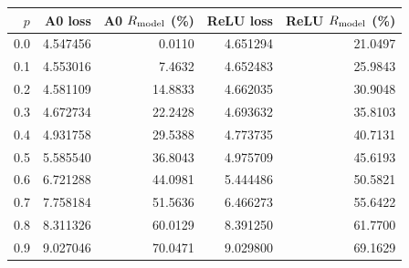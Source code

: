\begin{tabular}{rrrrr}
\toprule
$p$ & A0 loss & A0 $R_{\mathrm{model}}$ (\%) & ReLU loss & ReLU $R_{\mathrm{model}}$ (\%) \\
\midrule
0.0 & 4.547456 & 0.0110 & 4.651294 & 21.0497 \\
0.1 & 4.553016 & 7.4632 & 4.652483 & 25.9843 \\
0.2 & 4.581109 & 14.8833 & 4.662035 & 30.9048 \\
0.3 & 4.672734 & 22.2428 & 4.693632 & 35.8103 \\
0.4 & 4.931758 & 29.5388 & 4.773735 & 40.7131 \\
0.5 & 5.585540 & 36.8043 & 4.975709 & 45.6193 \\
0.6 & 6.721288 & 44.0981 & 5.444486 & 50.5821 \\
0.7 & 7.758184 & 51.5636 & 6.466273 & 55.6422 \\
0.8 & 8.311326 & 60.0129 & 8.391250 & 61.7700 \\
0.9 & 9.027046 & 70.0471 & 9.029800 & 69.1629 \\
\bottomrule
\end{tabular}
